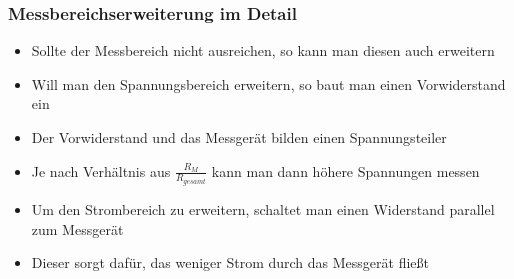 \begin{frame}
	\frametitle{Messbereichserweiterung im Detail}
	\begin{itemize}
		\item	Sollte der Messbereich nicht ausreichen, so kann man diesen auch erweitern
		\item	Will man den Spannungsbereich erweitern, so baut man einen Vorwiderstand ein
		\item	Der Vorwiderstand und das Messgerät bilden einen Spannungsteiler
		\item	Je nach Verhältnis aus $\frac{R_M}{R_{gesamt}}$ kann man dann höhere Spannungen messen
		\item	Um den Strombereich zu erweitern, schaltet man einen Widerstand parallel zum Messgerät
		\item	Dieser sorgt dafür, das weniger Strom durch das Messgerät fließt 
	\end{itemize}
\end{frame}

